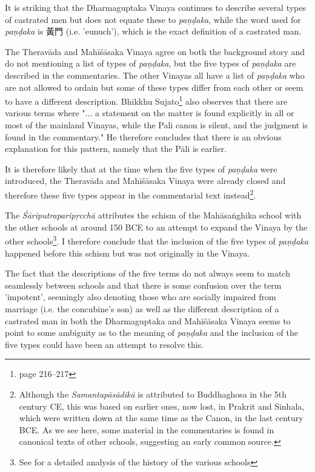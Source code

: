 It is striking that the Dharmaguptaka Vinaya continues to describe several types of castrated men but does not equate these to {\em paṇḍaka}, while the word used for {\em paṇḍaka} is 黃門 (i.e. 'eunuch'), which is the exact definition of a castrated man.

The Theravāda and Mahīśāsaka Vinaya agree on both the background story and do not mentioning a list of types of {\em paṇḍaka}, but the five types of {\em paṇḍaka} are described in the commentaries. The other Vinayas all have a list of {\em paṇḍaka} who are not allowed to ordain but some of these types differ from each other or seem to have a different description. Bhikkhu Sujato\footnote{\cite{sujato2009} page 216–217} also observes that there are various terms where "... a statement on the matter is found explicitly in all or most of the mainland Vinayas, while the Pali canon is silent, and the judgment is found in the commentary." He therefore concludes that there is an obvious explanation for this pattern, namely that the Pāli is earlier.

It is therefore likely that at the time when the five types of {\em paṇḍaka} were introduced, the Theravāda and Mahīśāsaka Vinaya were already closed and therefore these five types appear in the commentarial text instead\footnote{Although the {\em Samantapāsādikā} is attributed to Buddhaghosa in the 5th century CE, this was based on earlier ones, now lost, in Prakrit and Sinhala, which were written down at the same time as the Canon, in the last century BCE. As we see here, some material in the commentaries is found in canonical texts of other schools, suggesting an early common source.}. 

The {\em Śāriputraparipṛcchā} attributes the schism of the Mahāsaṅghika school with the other schools at around 150 BCE to an attempt to expand the Vinaya by the other schools\footnote{See \cite{sujato2012} for a detailed analysis of the history of the various schools}. I therefore conclude that the inclusion of the five types of {\em paṇḍaka} happened before this schism but was not originally in the Vinaya.

The fact that the descriptions of the five terms do not always seem to match seamlessly between schools and that there is some confusion over the term 'impotent', seemingly also denoting those who are socially impaired from marriage (i.e. the concubine's son) as well as the different description of a castrated man in both the Dharmaguptaka and Mahīśāsaka Vinaya seems to point to some ambiguity as to the meaning of {\em paṇḍaka} and the inclusion of the five types could have been an attempt to resolve this.


